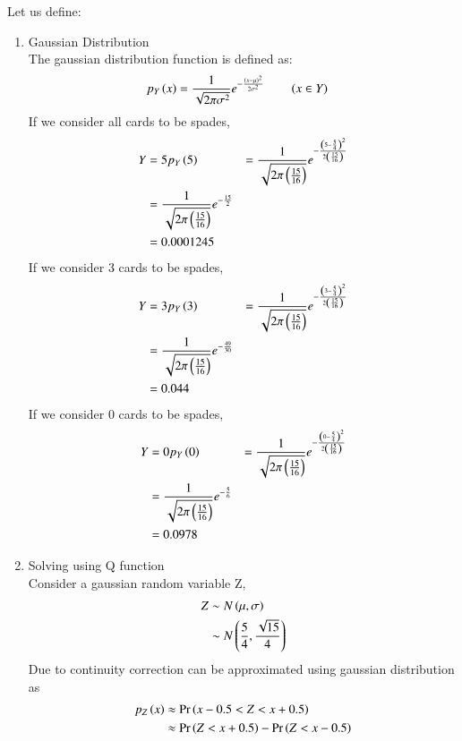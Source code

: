 \documentclass[journal,12pt,twocolumn]{IEEEtran}
\theoremstyle{remark}
\begin{document}
\solution
\fi
Let us define:
\begin{table}[!ht]

\end{table}
\begin{enumerate}[label=(\roman*)]
\item {Gaussian Distribution}\\
The gaussian distribution function is defined as:
\begin{align}
p_Y\left(x\right) &= \frac{1}{\sqrt{2\pi{\sigma}^2}} e^{-\frac{\left(x-\mu\right)^2}{2{\sigma}^2}} \qquad \left(x \in Y\right)
\end{align}
If we consider all cards to be spades,
\begin{align}
Y &= 5
p_Y\left(5\right) &= \frac{1}{\sqrt{2\pi\left(\frac{15}{16}\right)}} e^{-\frac{\left(5 - \frac{5}{4}\right)^2}{2\left(\frac{15}{16}\right)}}\\
		   &= \frac{1}{\sqrt{2\pi\left(\frac{15}{16}\right)}} e^{-\frac{15}{2}}\\
	           &= 0.0001245
\end{align}
If we consider 3 cards to be spades,
\begin{align}
Y &= 3
p_Y\left(3\right) &= \frac{1}{\sqrt{2\pi\left(\frac{15}{16}\right)}} e^{-\frac{\left(3 - \frac{5}{4}\right)^2}{2\left(\frac{15}{16}\right)}}\\
			      &= \frac{1}{\sqrt{2\pi\left(\frac{15}{16}\right)}} e^{-\frac{49}{30}}\\
			      &= 0.044
\end{align}
If we consider 0 cards to be spades,
\begin{align}
Y &= 0
p_Y\left(0\right) &= \frac{1}{\sqrt{2\pi\left(\frac{15}{16}\right)}} e^{-\frac{\left(0 - \frac{5}{4}\right)^2}{2\left(\frac{15}{16}\right)}}\\
			       &= \frac{1}{\sqrt{2\pi\left(\frac{15}{16}\right)}} e^{-\frac{5}{6}}\\
			       &= 0.0978
\end{align}
\item Solving using Q function\\
Consider a gaussian random variable Z,
\begin{align}
Z &\sim N\left(\mu,\sigma\right)\\
&\sim N\left(\frac{5}{4},\frac{\sqrt{15}}{4}\right)
\end{align}
Due to continuity correction  can be approximated using gaussian distribution as
\begin{align}
	p_Z\brak{x}&\approx\pr{x-0.5<Z<x+0.5}\\
	&\approx\pr{Z<x+0.5}-\pr{Z<x-0.5}	\\

\end{align}
\end{enumerate}
\end{document}
